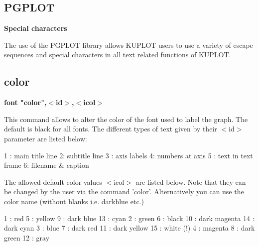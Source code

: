 \subsection*{PGPLOT}
{\bf Special characters \par }
\par
\vspace{3pt}
The use of the PGPLOT library allows KUPLOT users to use a variety 
of escape sequences and special characters in all text related 
functions of KUPLOT. 
\par
{}
\subsection*{color}
{\bf font "color",$ <$id$> $,$ <$icol$> $ \par }
\par
\vspace{3pt}
This command allows to alter the color of the font used to label the 
graph. The default is black for all fonts. The different types of 
text given by their $ <$id$> $ parameter are listed below: 
\par
\begin{MacVerbatim}
  1 : main title line               2: subtitle line
  3 : axis labels                   4: numbers at axis
  5 : text in text frame            6: filename & caption
\end{MacVerbatim}
The allowed default color values $ <$icol$> $ are listed below. Note 
that they can be changed by the user via the command 'color'. 
Alternatively you can use 
the color name (without blanks i.e. darkblue etc.) 
\par
\begin{MacVerbatim}
  1 : red       5 : yellow        9 : dark blue      13 : cyan
  2 : green     6 : black        10 : dark magenta   14 : dark cyan
  3 : blue      7 : dark red     11 : dark yellow    15 : white (!)
  4 : magenta   8 : dark green   12 : gray
\end{MacVerbatim}
